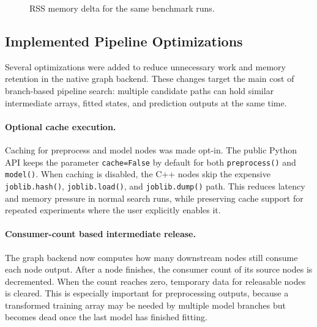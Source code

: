\documentclass[11pt,a4paper]{article}
\begin{document}
\begin{figure}[H]
\centering
{}
\caption{RSS memory delta for the same benchmark runs.}
\label{fig:pipe-memory-scaling}
\end{figure}

\subsection{Implemented Pipeline Optimizations}

Several optimizations were added to reduce unnecessary work and memory
retention in the native graph backend. These changes target the main cost of
branch-based pipeline search: multiple candidate paths can hold similar
intermediate arrays, fitted states, and prediction outputs at the same time.

\paragraph{Optional cache execution.}
Caching for preprocess and model nodes was made opt-in. The public Python API
keeps the parameter \texttt{cache=False} by default for both
\texttt{preprocess()} and \texttt{model()}. When caching is disabled, the C++
nodes skip the expensive \texttt{joblib.hash()}, \texttt{joblib.load()}, and
\texttt{joblib.dump()} path. This reduces latency and memory pressure in normal
search runs, while preserving cache support for repeated experiments where the
user explicitly enables it.

\paragraph{Consumer-count based intermediate release.}
The graph backend now computes how many downstream nodes still consume each
node output. After a node finishes, the consumer count of its source nodes is
decremented. When the count reaches zero, temporary data for releasable nodes
is cleared. This is especially important for preprocessing outputs, because a
transformed training array may be needed by multiple model branches but becomes
dead once the last model has finished fitting.
\end{document}
